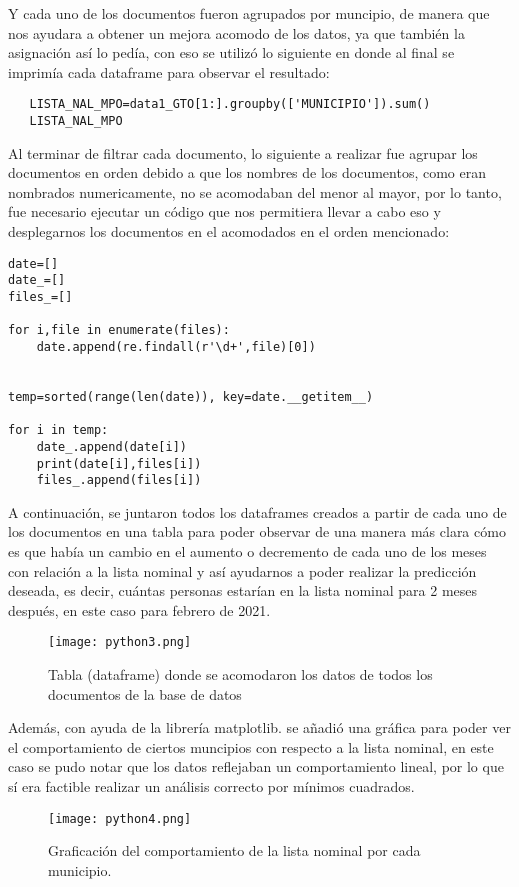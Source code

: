 \documentclass{article}
\begin{document}
\noindent Y cada uno de los documentos fueron agrupados por muncipio, de manera que nos ayudara a obtener un mejora acomodo de los datos, ya que también la asignación así lo pedía, con eso se utilizó lo siguiente en donde al final se imprimía cada dataframe para observar el resultado: 
    \begin{lstlisting}
   LISTA_NAL_MPO=data1_GTO[1:].groupby(['MUNICIPIO']).sum()
   LISTA_NAL_MPO
   \end{lstlisting}
   Al terminar de filtrar cada documento, lo siguiente a realizar fue agrupar los documentos en orden debido a que los nombres de los documentos, como eran nombrados numericamente, no se acomodaban del menor al mayor, por lo tanto, fue necesario ejecutar un código que nos permitiera llevar a cabo eso y desplegarnos los documentos en el acomodados en el orden mencionado:\\
    \begin{lstlisting}
date=[]
date_=[]
files_=[]

for i,file in enumerate(files):
    date.append(re.findall(r'\d+',file)[0])


temp=sorted(range(len(date)), key=date.__getitem__)

for i in temp:
    date_.append(date[i])
    print(date[i],files[i])
    files_.append(files[i])
   \end{lstlisting}
A continuación, se juntaron todos los dataframes creados a partir de cada uno de los documentos en una tabla para poder observar de una manera más clara cómo es que había un cambio en el aumento o decremento de cada uno de los meses con relación a la lista nominal y así ayudarnos a poder realizar la predicción deseada, es decir, cuántas personas estarían en la lista nominal para 2 meses después, en este caso para febrero de 2021. 

\begin{figure}[h]
    \centering
    \texttt{[image: python3.png]}
    \caption{Tabla (dataframe) donde se acomodaron los datos de todos los documentos de la base de datos}
    \label{fig:my_label}
\end{figure}
\noindent Además, con ayuda de la librería matplotlib. se añadió una gráfica para poder ver el comportamiento de ciertos muncipios con respecto a la lista nominal, en este caso se pudo notar que los datos reflejaban un comportamiento lineal, por lo que sí era factible realizar un análisis correcto por mínimos cuadrados.

\begin{figure}[h]
    \centering
    \texttt{[image: python4.png]}
    \caption{Graficación del comportamiento de la lista nominal por cada municipio.}
    \label{fig:my_label}
\end{figure}
\end{document}
